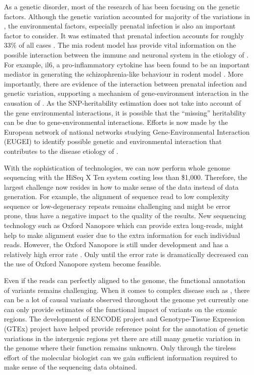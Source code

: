 \documentclass[12pt]{scrbook}
\newcommand*{\glng}{\glsentrylong}
\begin{document}
	As a genetic disorder, most of the research of \glng{scz} has been focusing on the genetic factors. 
	Although the genetic variation accounted for majority of the variations in \glng{scz}, the environmental factors, especially prenatal infection is also an important factor to consider. 
	It was estimated that prenatal infection accounts for roughly 33\% of all \glng{scz} cases \citep{Brown2010}.
	The \gls{mia} rodent model has provide vital information on the possible interaction between the immune and neuronal system in the etiology of \glng{scz} \citep{Meyer2007a}.
	For example, \gls{il6}, a pro-inflammatory cytokine has been found to be an important mediator in generating the schizophrenia-like behaviour in rodent model \citep{Smith2007}.
	More importantly, there are evidence of the interaction between prenatal infection and genetic variation, supporting a mechanism of gene-environment interaction in the causation of \glng{scz} \citep{Clarke2009}.
	As the \gls{SNP}-heritability estimation does not take into account of the gene environmental interactions, it is possible that the ``missing'' heritability can be due to gene-environmental interactions. 
	Efforts is now made by the European network of national \glng{scz} networks studying Gene-Environmental Interaction (EUGEI) to identify possible genetic and environmental interaction that contributes to the disease etiology of \glng{scz}.
	
	
	With the sophistication of technologies, we can now perform whole genome sequencing with the HiSeq \RN{10} Ten system costing less than \$1,000. 
	Therefore, the largest challenge now resides in how to make sense of the data instead of data generation.
	For example, the alignment of sequence read to low complexity sequence or low-degeneracy repeats remains challenging and might be error prone, thus have a negative impact to the quality of the results\citep{Sims2014}. 
	New sequencing technology such as Oxford Nanopore which can provide extra long-reads, might help to make alignment easier due to the extra information for each individual reads.
	However, the Oxford Nanopore is still under development and has a relatively high error rate \citep{Mikheyev2014}. 
	Only until the error rate is dramatically decreased can the use of Oxford Nanopore system become feasible. 
	
	Even if the reads can perfectly aligned to the genome, the functional annotation of variants remains challenging.
	When it comes to complex disease such as \glng{scz}, there can be a lot of causal variants observed throughout the genome yet currently one can only provide estimates of the functional impact of variants on the exomic regions.
	The development of ENCODE project \citep{ENCODEProjectConsortium2012} and Genotype-Tissue Expression (GTEx) project \citep{Consortium2015} have helped provide reference point for the annotation of genetic variations in the intergenic regions yet there are still many genetic variation in the genome where their function remains unknown. 
	Only through the tireless effort of the molecular biologist can we gain sufficient information required to make sense of the sequencing data obtained.	
	
\end{document}
